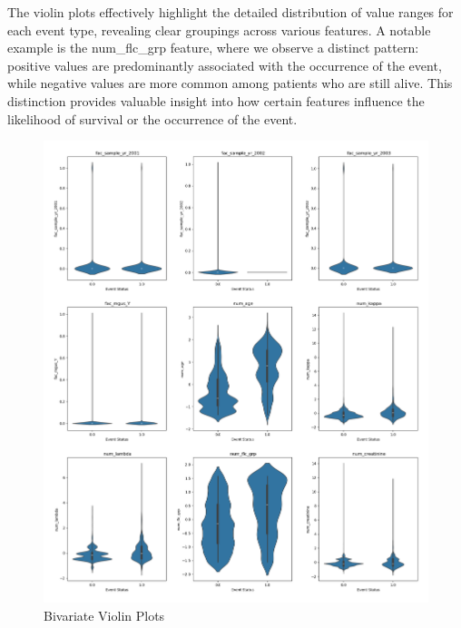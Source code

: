 \clearpage
\noindent The violin plots effectively highlight the detailed distribution of value ranges for each event type, revealing clear groupings across various features. A notable example is the num\_flc\_grp feature, where we observe a distinct pattern: positive values are predominantly associated with the occurrence of the event, while negative values are more common among patients who are still alive. This distinction provides valuable insight into how certain features influence the likelihood of survival or the occurrence of the event.
\begin{figure}[h]
    \centering
    \includegraphics[scale=0.33]{Figures/EDA/violin3.png}
    \caption{Bivariate Violin Plots}
    \label{fig:your_label}
\end{figure}



